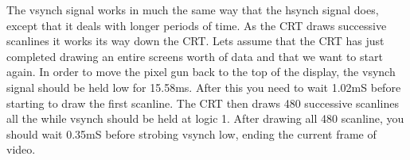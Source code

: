                             The vsynch signal works in much the same way that the hsynch signal
                            does, except that it deals with longer periods of time.  As the CRT
                            draws successive scanlines it works its way down the CRT.  Lets assume
                            that the CRT has just completed drawing an entire screens worth of
                            data and that we want to start again.  In order to move the pixel gun
                            back to the top of the display, the vsynch signal should be held low
                            for 15.58ms.  After this you need to wait 1.02mS before starting to
                            draw the first scanline.  The CRT then draws 480 successive scanlines
                            all the while vsynch should be held at logic 1.  After drawing all 480
                            scanline, you should wait 0.35mS before strobing vsynch low, ending the
                            current frame of video.

